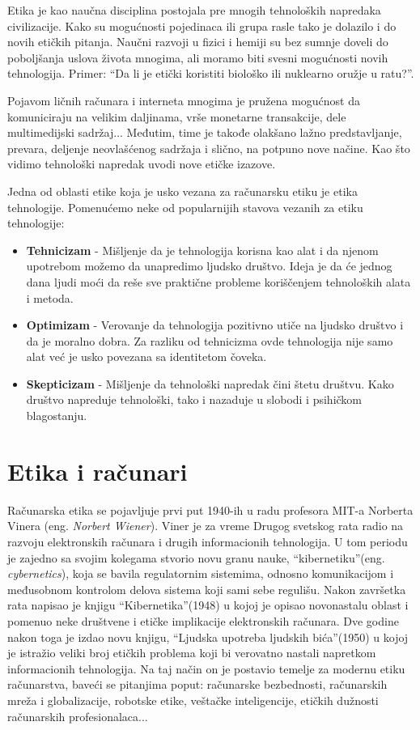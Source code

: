 \documentclass[a4paper]{article}
\begin{document}
Etika je kao naučna disciplina postojala pre mnogih tehnoloških napredaka civilizacije. Kako su mogućnosti pojedinaca ili grupa rasle tako je dolazilo i do novih etičkih pitanja. Naučni razvoji u fizici i hemiji su bez sumnje doveli do poboljšanja uslova života mnogima, ali moramo biti svesni mogućnosti novih tehnologija. Primer: ``Da li je etički koristiti biološko ili nuklearno oružje u ratu?''.

Pojavom ličnih računara i interneta mnogima je pružena mogućnost da komuniciraju na velikim daljinama, vrše monetarne transakcije, dele multimedijski sadržaj... Međutim, time je takođe olakšano lažno predstavljanje, prevara, deljenje neovlašćenog sadržaja i slično, na potpuno nove načine.
Kao što vidimo tehnološki napredak uvodi nove etičke izazove.

Jedna od oblasti etike koja je usko vezana za računarsku etiku je etika tehnologije. Pomenućemo neke od popularnijih stavova vezanih za etiku tehnologije:
\begin{itemize}
	\item \textbf{Tehnicizam} -
	Mišljenje da je tehnologija korisna kao alat i da njenom upotrebom možemo da unapredimo ljudsko društvo. Ideja je da će jednog dana ljudi moći da reše sve praktične probleme koriščenjem tehnoloških alata i metoda.
	\item \textbf{Optimizam} - Verovanje da tehnologija pozitivno utiče na ljudsko društvo i da je moralno dobra. Za razliku od tehnicizma ovde tehnologija nije samo alat već je usko povezana sa identitetom čoveka.
	\item \textbf{Skepticizam} - Mišljenje da tehnološki napredak čini štetu društvu. Kako društvo napreduje tehnološki, tako i nazaduje u slobodi i psihičkom blagostanju.
\end{itemize}


\section{Etika i računari}

Računarska etika se pojavljuje prvi put 1940-ih u radu profesora MIT-a
Norberta Vinera (eng. \textit{Norbert Wiener})\cite{bynum}. Viner je za vreme Drugog svetskog rata radio na razvoju elektronskih računara i drugih informacionih tehnologija. U tom periodu je zajedno sa svojim kolegama stvorio novu granu nauke, ``kibernetiku''(eng. \textit{cybernetics}), koja se bavila regulatornim sistemima, odnosno komunikacijom i međusobnom kontrolom delova sistema koji sami sebe regulišu.
Nakon završetka rata napisao je knjigu ``Kibernetika''(1948) u kojoj je opisao novonastalu oblast i pomenuo neke društvene i etičke implikacije elektronskih računara. Dve godine nakon toga je izdao novu knjigu, ``Ljudska upotreba ljudskih bića''(1950) u kojoj je istražio veliki broj etičkih problema koji bi verovatno nastali napretkom informacionih tehnologija. Na taj način on je postavio temelje za modernu etiku računarstva, baveći se pitanjima poput: računarske bezbednosti, računarskih mreža i globalizacije, robotske etike, veštačke inteligencije, etičkih dužnosti računarskih profesionalaca...
\end{document}
